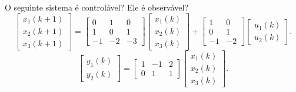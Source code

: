\begin{question}
  O seguinte sistema é controlável? Ele é observável?
  \[
    \begin{bmatrix}
      x_1(k+1) \\
      x_2(k+1) \\
      x_3(k+1)
    \end{bmatrix}
    =
    \begin{bmatrix}
      0  & 1  & 0  \\
      1  & 0  & 1  \\
      -1 & -2 & -3
    \end{bmatrix}
    \begin{bmatrix}
      x_1(k) \\
      x_2(k) \\
      x_3(k)
    \end{bmatrix}
    +
    \begin{bmatrix}
      1  & 0  \\
      0  & 1  \\
      -1 & -2
    \end{bmatrix}
    \begin{bmatrix}
      u_1(k) \\
      u_2(k)
    \end{bmatrix}.
  \]
  \[
    \begin{bmatrix}
      y_1(k) \\
      y_2(k)
    \end{bmatrix}
    =
    \begin{bmatrix}
      1 & -1 & 2 \\
      0 & 1  & 1
    \end{bmatrix}
    \begin{bmatrix}
      x_1(k) \\
      x_2(k) \\
      x_3(k)
    \end{bmatrix}.
  \]
\end{question}

\begin{resolution}

\end{resolution}

